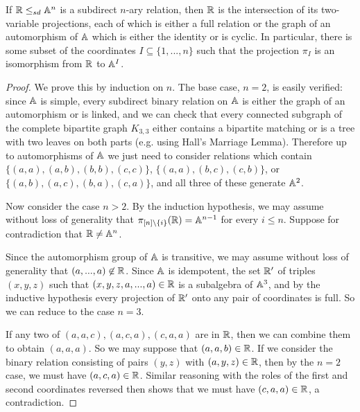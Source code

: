 \documentclass[letterpaper,11pt]{article}
\begin{document}
\begin{prop}\label{rps-decompose} If $\mathbb{R} \le_{sd} \mathbb{A}^n$ is a subdirect $n$-ary relation, then $\mathbb{R}$ is the intersection of its two-variable projections, each of which is either a full relation or the graph of an automorphism of $\mathbb{A}$ which is either the identity or is cyclic. In particular, there is some subset of the coordinates $I \subseteq \{1, ..., n\}$ such that the projection $\pi_I$ is an isomorphism from $\mathbb{R}$ to $\mathbb{A}^I$.
\end{prop}
\begin{proof} We prove this by induction on $n$. The base case, $n = 2$, is easily verified: since $\mathbb{A}$ is simple, every subdirect binary relation on $\mathbb{A}$ is either the graph of an automorphism or is linked, and we can check that every connected subgraph of the complete bipartite graph $K_{3,3}$ either contains a bipartite matching or is a tree with two leaves on both parts (e.g. using Hall's Marriage Lemma). Therefore up to automorphisms of $\mathbb{A}$ we just need to consider relations which contain $\{(a,a),(a,b),(b,b),(c,c)\}$, $\{(a,a),(b,c),(c,b)\}$, or $\{(a,b),(a,c),(b,a),(c,a)\}$, and all three of these generate $\mathbb{A}^2$.

Now consider the case $n > 2$. By the induction hypothesis, we may assume without loss of generality that $\pi_{[n]\setminus \{i\}}(\mathbb{R}) = \mathbb{A}^{n-1}$ for every $i \le n$. Suppose for contradiction that $\mathbb{R} \ne \mathbb{A}^n$.

Since the automorphism group of $\mathbb{A}$ is transitive, we may assume without loss of generality that $(a,...,a) \not\in \mathbb{R}$. Since $\mathbb{A}$ is idempotent, the set $\mathbb{R}'$ of triples $(x,y,z)$ such that $(x,y,z,a,...,a) \in \mathbb{R}$ is a subalgebra of $\mathbb{A}^3$, and by the inductive hypothesis every projection of $\mathbb{R}'$ onto any pair of coordinates is full. So we can reduce to the case $n = 3$.

If any two of $(a,a,c), (a,c,a), (c,a,a)$ are in $\mathbb{R}$, then we can combine them to obtain $(a,a,a)$. So we may suppose that $(a,a,b) \in \mathbb{R}$. If we consider the binary relation consisting of pairs $(y,z)$ with $(a,y,z) \in \mathbb{R}$, then by the $n = 2$ case, we must have $(a,c,a) \in \mathbb{R}$. Similar reasoning with the roles of the first and second coordinates reversed then shows that we must have $(c,a,a) \in \mathbb{R}$, a contradiction.
\end{proof}
\end{document}
